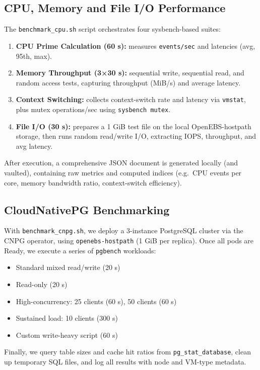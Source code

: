 \subsection{CPU, Memory and File I/O Performance}

The \texttt{benchmark\_cpu.sh} script orchestrates four sysbench-based suites:
\begin{enumerate}
  \item \textbf{CPU Prime Calculation (60 s):} measures \texttt{events/sec} and latencies (avg, 95th, max).
  \item \textbf{Memory Throughput (3×30 s):} sequential write, sequential read, and random access tests, capturing throughput (MiB/s) and average latency.
  \item \textbf{Context Switching:} collects context-switch rate and latency via \texttt{vmstat}, plus mutex operations/sec using \texttt{sysbench mutex}.
  \item \textbf{File I/O (30 s):} prepares a 1 GiB test file on the local OpenEBS-hostpath storage, then runs random read/write I/O, extracting IOPS, throughput, and avg latency.
\end{enumerate}
After execution, a comprehensive JSON document is generated locally (and vaulted), containing raw metrics and computed indices (e.g.\ CPU events per core, memory bandwidth ratio, context-switch efficiency).  

\subsection{CloudNativePG Benchmarking}

With \texttt{benchmark\_cnpg.sh}, we deploy a 3-instance PostgreSQL cluster via the CNPG operator, using \texttt{openebs-hostpath} (1 GiB per replica). Once all pods are Ready, we execute a series of \texttt{pgbench} workloads:
\begin{itemize}
  \item Standard mixed read/write (20 s)
  \item Read-only (20 s)
  \item High-concurrency: 25 clients (60 s), 50 clients (60 s)
  \item Sustained load: 10 clients (300 s)
  \item Custom write-heavy script (60 s)
\end{itemize}
Finally, we query table sizes and cache hit ratios from \texttt{pg\_stat\_database}, clean up temporary SQL files, and log all results with node and VM-type metadata.

